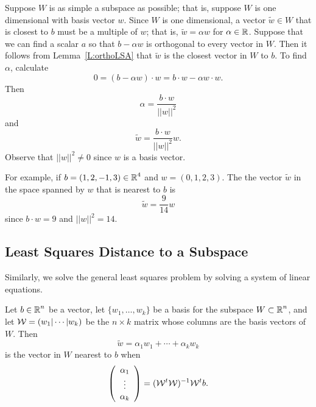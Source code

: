 \documentclass{ximera}
\begin{document}
Suppose $W$ is as simple a subspace as possible; that is, suppose $W$ is one
dimensional with basis vector $w$.  Since $W$ is one dimensional, a vector
$\tilde{w}\in W$ that is closest to $b$ must be a multiple of $w$; that is,
$\tilde{w} = \alpha w$ for $\alpha\in\mbox{$\mathbb{R}$}$.  Suppose that we can find a scalar $a$ 
so that $b - \alpha w$ is orthogonal to every vector in $W$.  Then it follows from
Lemma~\ref{L:orthoLSA} that $\tilde{w}$ is the closest vector in $W$ to $b$.
To find $\alpha$, calculate
\[
0 = (b- \alpha w)\cdot w = b\cdot w - \alpha w\cdot w.
\]
Then
\[
\alpha = \frac{b\cdot w}{||w||^2}
\]
and
\begin{equation}  \label{E:singleortho}
\tilde{w} = \frac{b\cdot w}{||w||^2} w.
\end{equation}
Observe that $||w||^2\not=0$ since $w$ is a basis vector.

For example, if $b = (1,2,-1,3)\in\mbox{$\mathbb{R}$}^4$ and $w=(0,1,2,3)$.  The the vector
$\tilde{w}$ in the space spanned by $w$ that is nearest to $b$ is
\[
\tilde{w} = \frac{9}{14}w
\]
since $b \cdot w = 9$ and $||w||^2 = 14$.

\subsection*{Least Squares Distance to a Subspace}

Similarly, we solve the general least squares problem by solving a 
system of linear equations.


\begin{theorem}  \label{T:nearestvector}
Let $b\in\mbox{$\mathbb{R}$}^n$ be a vector, let $\{w_1,\ldots,w_k\}$ be a basis 
for the subspace $W\subset\mbox{$\mathbb{R}$}^n$, and let $\mathcal{W} = (w_1|\cdots|w_k)$ 
be the $n\times k$ matrix whose columns are the basis vectors of $W$. Then
\begin{equation} \label{e:w_0_in_basis}
\tilde{w} = \alpha_1w_1 + \cdots + \alpha_kw_k
\end{equation}
is the vector in $W$ nearest to $b$ when
\begin{equation}  \label{E:nearestvector}
\left(\begin{array}{c} \alpha_1 \\ \vdots \\ \alpha_k \end{array}\right) =
(\mathcal{W}^t\mathcal{W})^{-1} \mathcal{W}^t b.
\end{equation}
\end{theorem}
\end{document}
